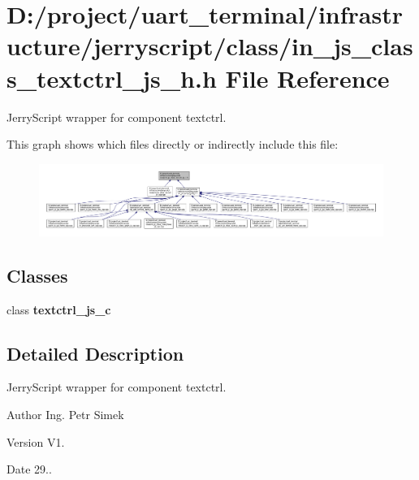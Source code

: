 \section{D\+:/project/uart\+\_\+terminal/infrastructure/jerryscript/class/in\+\_\+js\+\_\+class\+\_\+textctrl\+\_\+js\+\_\+h.h File Reference}
\label{in__js__class__textctrl__js__h_8h}


Jerry\+Script wrapper for component textctrl.  


This graph shows which files directly or indirectly include this file\+:
\nopagebreak
\begin{figure}[H]
\begin{center}
\leavevmode
\includegraphics[width=350pt]{in__js__class__textctrl__js__h_8h__dep__incl}
\end{center}
\end{figure}
\subsection*{Classes}
\begin{DoxyCompactItemize}
\item 
class \textbf{ textctrl\+\_\+js\+\_\+c}
\end{DoxyCompactItemize}


\subsection{Detailed Description}
Jerry\+Script wrapper for component textctrl. 

\begin{DoxyAuthor}{Author}
Ing. Petr Simek 
\end{DoxyAuthor}
\begin{DoxyVersion}{Version}
V1. 
\end{DoxyVersion}
\begin{DoxyDate}{Date}
29.. 
\end{DoxyDate}
